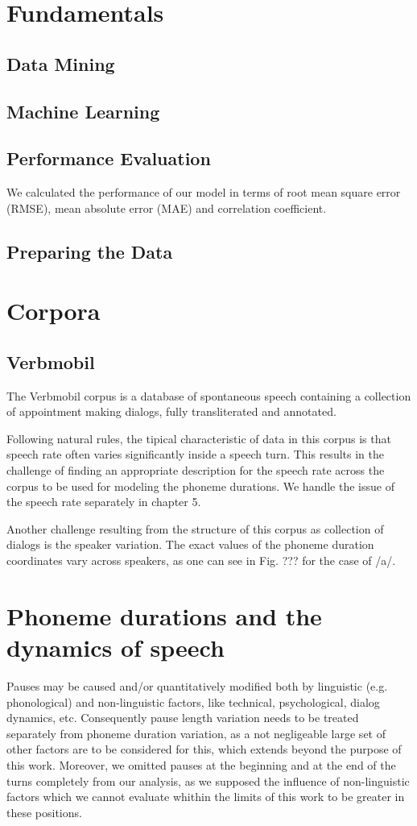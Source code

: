 \documentclass[a4paper]{scrreprt}
\begin{document}
\chapter{Fundamentals}
\section{Data Mining}
\section{Machine Learning}
\section{Performance Evaluation}
We calculated the performance of our model in terms of root mean square error (RMSE), mean absolute error (MAE) and correlation coefficient.
\section{Preparing the Data}

\chapter{Corpora}
\section{Verbmobil}
The Verbmobil corpus is a database of spontaneous speech containing a collection of appointment making dialogs, fully transliterated and annotated.

Following natural rules, the tipical characteristic of data in this corpus is that speech rate often varies significantly inside a speech turn. This results in the challenge of finding an appropriate description for the speech rate across the corpus to be used for modeling the phoneme durations. We handle the issue of the speech rate separately in chapter 5. 

Another challenge resulting from the structure of this corpus as collection of dialogs is the speaker variation. The exact values of the phoneme duration coordinates vary across speakers, as one can see in Fig. ??? for the case of /a/.

\chapter{Phoneme durations and the dynamics of speech}
Pauses may be caused and/or quantitatively modified both by linguistic (e.g. phonological) and non-linguistic factors, like technical, psychological, dialog dynamics, etc. Consequently pause length variation needs to be treated separately from phoneme duration variation, as a not negligeable large set of other factors are to be considered for this, which extends beyond the purpose of this work. Moreover, we omitted pauses at the beginning and at the end of the turns completely from our analysis, as we supposed the influence of non-linguistic factors which we cannot evaluate whithin the limits of this work to be greater in these positions.
\end{document}
